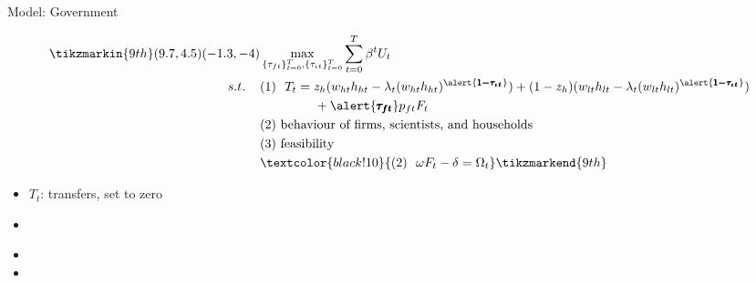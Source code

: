 \documentclass[11pt,aspectratio=169]{beamer}
\begin{document}
\addtocounter{framenumber}{-1}
\begin{frame}{Model: Government}
	\begin{minipage}[t!]{1\textwidth}
		\begin{align*}
		\tikzmarkin{9th}(9.7,4.5)(-1.3,-4)
		&\max_{\{\tau_{ft}\}_{t=0}^{T}, \{\tau_{\iota t}\}_{t=0}^{T}} \sum_{t=0}^{T}\beta^t U_{t}\\
		s.t. \hspace{4mm}
		&(1)\ \ T_t= z_h(w_{ht}h_{ht}-\lambda_t(w_{ht}h_{ht})^{\alert{\pmb{1-\tau_{\iota t}}}})+(1-z_h)(w_{lt}h_{lt}-\lambda_t(w_{lt}h_{lt})^{\alert{\pmb{1-\tau_{\iota t}}}})\\ & \hspace{15mm }+\alert{\pmb{\tau_{ft}}}p_{ft}F_{t}\\
		& (2)\ \text{behaviour of firms, scientists, and households}\\
		& (3)\ \text{feasibility} \\
		&\textcolor{black!10}{
			(2)\ \  \omega F_t-\delta =\Omega_t }
		\tikzmarkend{9th}
		\end{align*}
	\end{minipage}
	
	\small
	\vspace{0mm}
	\begin{minipage}[t!]{0.35\textwidth}
		\vspace{7mm}
		\begin{itemize}
			\item[] $T_t$: transfers, set to zero  \vspace{0mm}
			\item[] 
		\end{itemize}
	\end{minipage}
	\begin{minipage}[t!]{0.6\textwidth}
		\vspace{8mm}
		\begin{itemize}
			\item[]%
			\vspace{0mm}	
			\item[] %
		\end{itemize}
	\end{minipage}

\end{frame}
\end{document}
